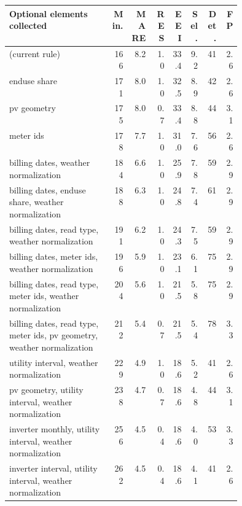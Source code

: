 \begin{tabular}{p{0.44\linewidth}rrrrrrr}
\hline
Optional elements collected & Min. & MARE & RES & EEI & Sel. & Det. & FP \\
\hline
(current rule) & 166 & 8.2 & 1.0 & 33.4 & 9.2 & 41 & 2.6 \\
enduse share & 171 & 8.0 & 1.0 & 32.5 & 8.9 & 42 & 2.6 \\
pv geometry & 175 & 8.0 & 0.7 & 33.4 & 8.8 & 44 & 3.1 \\
meter ids & 178 & 7.7 & 1.0 & 31.0 & 7.6 & 56 & 2.6 \\
billing dates, weather normalization & 184 & 6.6 & 1.0 & 25.9 & 7.8 & 59 & 2.9 \\
billing dates, enduse share, weather normalization & 188 & 6.3 & 1.0 & 24.8 & 7.4 & 61 & 2.9 \\
billing dates, read type, weather normalization & 191 & 6.2 & 1.0 & 24.3 & 7.5 & 59 & 2.9 \\
billing dates, meter ids, weather normalization & 196 & 5.9 & 1.0 & 23.1 & 6.1 & 75 & 2.9 \\
billing dates, read type, meter ids, weather normalization & 204 & 5.6 & 1.0 & 21.5 & 5.8 & 75 & 2.9 \\
billing dates, read type, meter ids, pv geometry, weather normalization & 212 & 5.4 & 0.7 & 21.5 & 5.4 & 78 & 3.3 \\
utility interval, weather normalization & 229 & 4.9 & 1.0 & 18.6 & 5.2 & 41 & 2.6 \\
pv geometry, utility interval, weather normalization & 238 & 4.7 & 0.7 & 18.6 & 4.8 & 44 & 3.1 \\
inverter monthly, utility interval, weather normalization & 256 & 4.5 & 0.4 & 18.6 & 4.0 & 53 & 3.3 \\
inverter interval, utility interval, weather normalization & 262 & 4.5 & 0.4 & 18.6 & 4.1 & 41 & 2.6 \\
\hline
\end{tabular}
